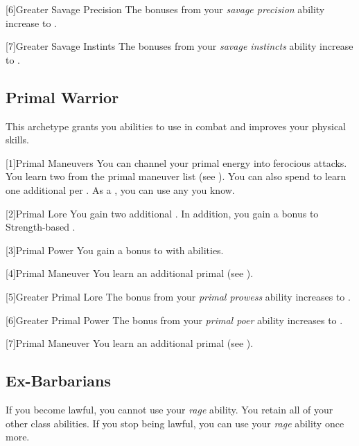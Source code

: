         [6]{Greater Savage Precision} The bonuses from your \textit{savage precision} ability increase to .

        [7]{Greater Savage Instints} The bonuses from your \textit{savage instincts} ability increase to .

    \subsection{Primal Warrior}
        This archetype grants you abilities to use in combat and improves your physical skills.

        [1]{Primal Maneuvers}
        You can channel your primal energy into ferocious attacks.
        You learn two  from the primal maneuver list (see ).
        You can also spend  to learn one additional  per .
        As a , you can use any  you know.

        [2]{Primal Lore} You gain two additional .
        In addition, you gain a  bonus to Strength-based .

        [3]{Primal Power} You gain a  bonus to  with  abilities.

        [4]{Primal Maneuver}
        You learn an additional primal  (see ).

        [5]{Greater Primal Lore} The bonus from your \textit{primal prowess} ability increases to .

        [6]{Greater Primal Power} The bonus from your \textit{primal poer} ability increases to .

        [7]{Primal Maneuver}
        You learn an additional primal  (see ).

    \subsection{Ex-Barbarians}
        If you become lawful, you cannot use your \textit{rage} ability.
        You retain all of your other class abilities.
        If you stop being lawful, you can use your \textit{rage} ability once more.

